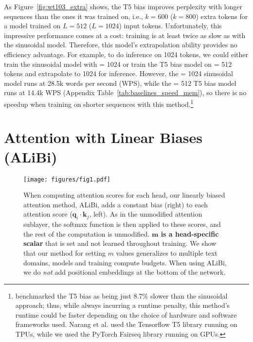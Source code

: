 As Figure~\ref{fig:wt103_extra} shows, the T5 bias improves perplexity with longer sequences than the ones it was trained on, i.e.,  $k=600$ ($k=800$) extra tokens for a model trained on $L=512$ ($L=1024$) input tokens.  Unfortunately, this impressive performance comes at a cost: training is at least twice as slow as with the sinusoidal model. Therefore, this model's extrapolation ability provides no efficiency advantage. For example, to do inference on 1024 tokens, we could either train the sinusoidal model with \lt = 1024 or train the T5 bias model on \lt = 512 tokens and extrapolate to 1024 for inference. However, the \lt = 1024 sinusoidal model runs at 28.5k words per second (WPS), while the \lt = 512 T5 bias model runs at 14.4k WPS (Appendix Table~\ref{tab:baselines_speed_mem}), so there is no speedup when training on shorter sequences with this method.\footnote{ \citet{narang2021transformer} benchmarked the T5 bias as being just 8.7\% slower than the sinusoidal approach; thus,   while always incurring a runtime penalty, this method's runtime could be faster depending on the choice of hardware and software frameworks used. Narang et al. used the Tensorflow T5 library running on TPUs, while we used the PyTorch Fairseq library running on GPUs. }

\section{Attention with Linear Biases (ALiBi)}
\label{sec:ourmethod}

\begin{figure}
\begin{center}
\texttt{[image: figures/fig1.pdf]} %
\end{center}
\caption{When computing attention scores for each head, our linearly biased attention method, ALiBi,  adds a constant bias (right) to each attention score ($\mathbf{q}_i \cdot \mathbf{k}_j$, left). As in the unmodified attention sublayer, the softmax function is then applied to these scores, and the rest of the computation is unmodified. \textbf{$\textbf{m}$ is a head-specific scalar} that is set and not learned throughout training. We show that our method for setting $m$ values generalizes to multiple text domains, models and training compute budgets. %
When using ALiBi, we do \emph{not} add positional embeddings at the bottom of the network.  }
\label{fig:1}
\end{figure}

